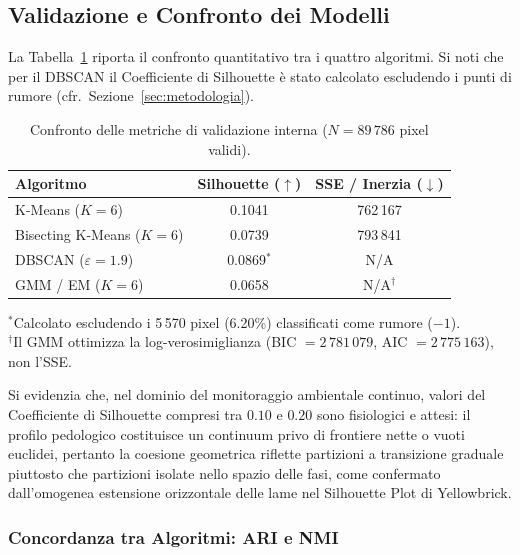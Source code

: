 \documentclass[a4paper,12pt]{article}
\begin{document}
\subsection{Validazione e Confronto dei Modelli}

La Tabella~\ref{tab:validazione} riporta il confronto quantitativo tra
i quattro algoritmi. Si noti che per il DBSCAN il Coefficiente di
Silhouette è stato calcolato escludendo i punti di rumore
(cfr.\ Sezione~\ref{sec:metodologia}).

\begin{table}[H]
    \centering
    \caption{Confronto delle metriche di validazione interna ($N = 89\,786$ pixel validi).}
    \label{tab:validazione}
    \begin{tabular}{@{}lcc@{}}
        \toprule
        \textbf{Algoritmo} & \textbf{Silhouette} ($\uparrow$) &
        \textbf{SSE / Inerzia} ($\downarrow$) \\
        \midrule
        K-Means ($K=6$)            & 0.1041  & 762\,167 \\
        Bisecting K-Means ($K=6$)  & 0.0739  & 793\,841 \\
        DBSCAN ($\varepsilon=1.9$) & 0.0869$^*$  & N/A \\
        GMM / EM ($K=6$)           & 0.0658  & N/A$^\dagger$ \\
        \bottomrule
    \end{tabular}

    \vspace{4pt}
    {\footnotesize $^*$Calcolato escludendo i 5\,570 pixel (6.20\%) classificati come rumore ($-1$).}\\
    {\footnotesize $^\dagger$Il GMM ottimizza la log-verosimiglianza (BIC $= 2\,781\,079$, AIC $= 2\,775\,163$), non l'SSE.}
\end{table}

Si evidenzia che, nel dominio del monitoraggio ambientale continuo, valori del Coefficiente di Silhouette compresi tra $0.10$ e $0.20$ sono fisiologici e attesi: il profilo pedologico costituisce un continuum privo di frontiere nette o vuoti euclidei, pertanto la coesione geometrica riflette partizioni a transizione graduale piuttosto che partizioni isolate nello spazio delle fasi, come confermato dall'omogenea estensione orizzontale delle lame nel Silhouette Plot di Yellowbrick.

\subsubsection{Concordanza tra Algoritmi: ARI e NMI}
\end{document}
